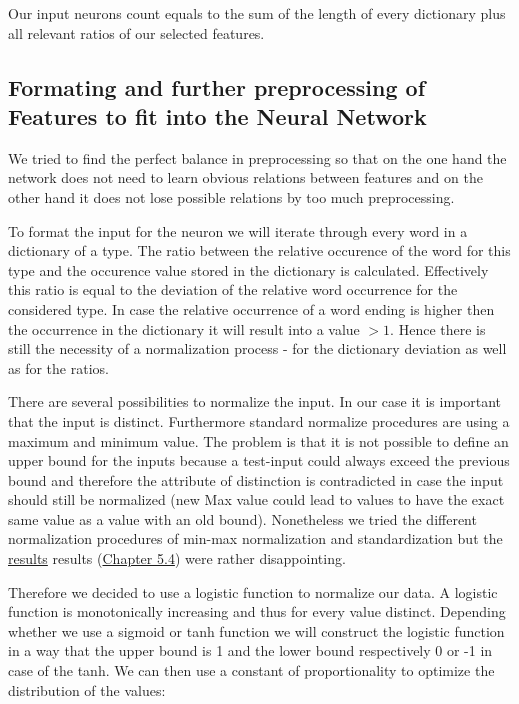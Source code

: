 \documentclass[paper=A4,pagesize=auto,12pt,headinclude=true,footinclude=true,BCOR=0mm,DIV=calc]{scrartcl}
\begin{document}
	Our input neurons count equals to the sum of the length of every dictionary plus all relevant ratios of our selected features.
	
	\subsection{Formating and further preprocessing of Features to fit into the Neural Network}
	We tried to find the perfect balance in preprocessing so that on the one hand the network does not need to learn obvious relations between features and on the other hand it does not lose possible relations by too much preprocessing.
	
	To format the input for the neuron we will iterate through every word in a dictionary of a type. The ratio between the relative occurence of the word for this type and the occurence value stored in the dictionary is calculated. Effectively this ratio is equal to the deviation of the relative word occurrence for the considered type. In case the relative occurrence of a word ending is higher then the occurrence in the dictionary it will result into a value $> 1$. Hence there is still the necessity of a normalization process - for the dictionary deviation as well as for the ratios.
	
	There are several possibilities to normalize the input. In our case it is important that the input is distinct. Furthermore standard normalize procedures are using a maximum and minimum value. The problem is that it is not possible to define an upper bound for the inputs because a test-input could always exceed the previous bound and therefore the attribute of distinction is contradicted in case the input should still be normalized (new Max value could lead to values to have the exact same value as a value with an old bound). Nonetheless we tried the different normalization procedures of min-max normalization and standardization but the \hyperref[src:optimizing]{results} results (\hyperref[src:optimizing]{Chapter 5.4}) were rather disappointing.
	
	
	Therefore we decided to use a logistic function to normalize our data. A logistic function is monotonically increasing and thus for every value distinct. Depending whether we use a sigmoid or tanh function we will construct the logistic function in a way that the upper bound is 1 and the lower bound respectively 0 or -1 in case of the tanh. 
	We can then use a constant of proportionality to optimize the distribution of the values:
	
\end{document}

